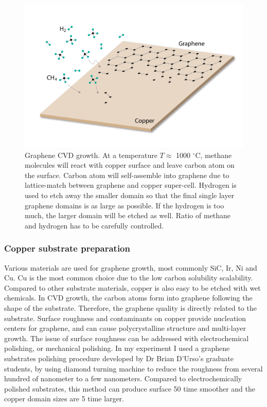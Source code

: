 \documentclass[pdflatex, sectionletters, 12pt]{pittetd}    %
\begin{document}
\begin{figure}[h!]
	\centering
	\includegraphics[width=.90\textwidth]{Drawing/CVD.pdf}
	\caption{Graphene CVD growth. At a temperature $T \approx$ 1000 $^{\circ}$C, methane molecules will react with copper surface and leave carbon atom on the surface. Carbon atom will self-assemble into graphene due to lattice-match between graphene and copper super-cell. Hydrogen is used to etch away the smaller domain so that the final single layer graphene domains is as large as possible. If the hydrogen is too much, the larger domain will be etched as well. Ratio of methane and hydrogen has to be carefully controlled.}
	\label{FIG:CVD}
\end{figure}

\subsubsection{Copper substrate preparation}

Various materials are used for graphene growth, most commonly SiC, Ir, Ni and Cu. Cu is the most common choice due to the low carbon solubility scalability\cite{Bae2010}. Compared to other substrate materials, copper is also easy to be etched with wet chemicals. In CVD growth, the carbon atoms form into graphene following the shape of the substrate. Therefore, the graphene quality is directly related to the substrate. Surface roughness and contaminants on copper provide nucleation centers for graphene, and can cause polycrystalline structure and multi-layer growth\cite{eres2014cooperative}. The issue of surface roughness can be addressed with electrochemical polishing\cite{Bae2010}, or mechanical polishing. In my experiment I used a graphene substrates polishing procedure developed by Dr Brian D'Urso's graduate students, by using diamond turning machine to reduce the roughness from several hundred of nanometer to a few nanometers\cite{dhingra2014chemical}. Compared to electrochemically polished substrates, this method can produce surface 50 time smoother and the copper domain sizes are 5 time larger. 
\end{document}
